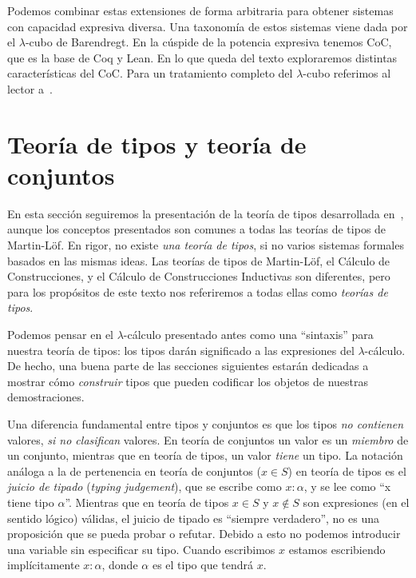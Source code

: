 \documentclass[
  a4paper, 
  10pt, 
  parskip=half, 
  toc=bibliography,
]{scrbook}
\theoremstyle{definition}
\theoremstyle{bolddef}
\begin{document}
Podemos combinar estas extensiones de forma arbitraria para obtener sistemas
con capacidad expresiva diversa. Una taxonomía de estos sistemas viene dada 
por el \(\lambda\)-cubo de Barendregt. En la cúspide de la potencia expresiva 
tenemos CoC, que es la base de Coq y Lean. En lo que queda del texto exploraremos
distintas características del CoC. Para un tratamiento completo del
\(\lambda\)-cubo referimos al lector a~\cite{lambda_with_types}.

\section{Teoría de tipos y teoría de conjuntos}

En esta sección seguiremos la presentación de la teoría de tipos
desarrollada en~\cite{hottbook}, aunque los conceptos presentados son
comunes a todas las teorías de tipos de Martin-Löf. En rigor, no existe 
\emph{una teoría de tipos}, si no varios sistemas formales basados en las mismas ideas.
Las teorías de tipos de Martin-Löf, 
el Cálculo de Construcciones, y el Cálculo de
Construcciones Inductivas son diferentes, pero para los propósitos de este texto
nos referiremos a todas ellas como \emph{teorías de tipos}.

Podemos pensar en el \(\lambda\)-cálculo presentado antes como una \enquote{sintaxis} para
nuestra teoría de tipos: los tipos darán significado a las expresiones del
\(\lambda\)-cálculo. De hecho, una buena parte de las secciones siguientes estarán
dedicadas a mostrar cómo \emph{construir} tipos que pueden codificar los objetos
de nuestras demostraciones.

Una diferencia fundamental entre tipos y conjuntos es que los tipos 
\emph{no contienen} valores, \emph{si no clasifican} valores. En teoría de conjuntos un
valor es un \emph{miembro} de un conjunto, mientras que en teoría de tipos, un
valor \emph{tiene} un tipo. La notación análoga a la de pertenencia en teoría de
conjuntos (\(x \in S\)) en teoría de tipos es el \emph{juicio de tipado} (\emph{typing judgement}), 
que se escribe como \(x: \alpha\), y se lee como \enquote{x tiene tipo
\(\alpha\)}.
Mientras que en teoría de tipos \(x \in S\) y \(x \notin S\) son expresiones
(en el sentido lógico) válidas, el juicio de tipado es \enquote{siempre verdadero}, no es
una proposición que se pueda probar o refutar. Debido a esto no podemos
introducir una variable sin especificar su tipo. Cuando escribimos \(x\) estamos
escribiendo implícitamente \(x: \alpha\), donde \(\alpha\) es el tipo que tendrá \(x\).
\end{document}
